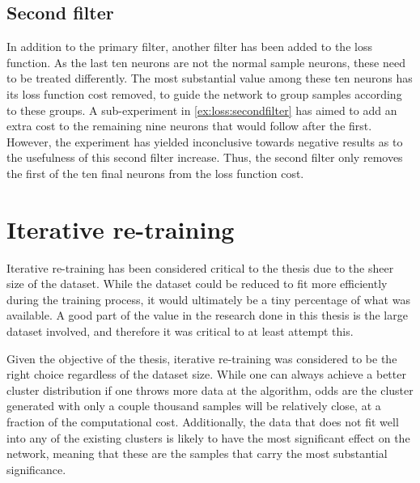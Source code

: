 \subsection{Second filter}
\label{me:secondfilter}
In addition to the primary filter, another filter has been added to the loss function.
As the last ten neurons are not the normal sample neurons, these need to be treated differently.
The most substantial value among these ten neurons has its loss function cost removed, to guide the network to group samples according to these groups.
A sub-experiment in \cref{ex:loss:secondfilter} has aimed to add an extra cost to the remaining nine neurons that would follow after the first.
However, the experiment has yielded inconclusive towards negative results as to the usefulness of this second filter increase.
Thus, the second filter only removes the first of the ten final neurons from the loss function cost.





\section{Iterative re-training}
\label{me:iter-retrain}
Iterative re-training has been considered critical to the thesis due to the sheer size of the dataset.
While the dataset could be reduced to fit more efficiently during the training process, it would ultimately be a tiny percentage of what was available.
A good part of the value in the research done in this thesis is the large dataset involved, and therefore it was critical to at least attempt this.

Given the objective of the thesis, iterative re-training was considered to be the right choice regardless of the dataset size.
While one can always achieve a better cluster distribution if one throws more data at the algorithm, odds are the cluster generated with only a couple thousand samples will be relatively close, at a fraction of the computational cost.
Additionally, the data that does not fit well into any of the existing clusters is likely to have the most significant effect on the network, meaning that these are the samples that carry the most substantial significance.


